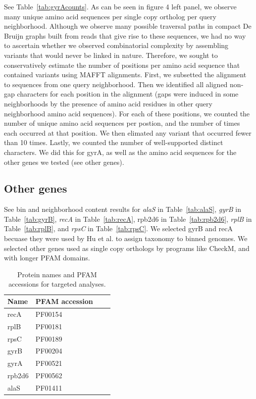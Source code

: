 See Table~\ref{tab:gyrAcounts}. As can be seen in figure 4 left panel, we observe
many unique amino acid sequences per single copy ortholog per query neighborhood.
Although we observe many possible traversal paths in compact De Bruijn graphs built
from reads that give rise to these sequences, we had no way to ascertain whether we
observed combinatorial complexity by assembling variants that would never be linked 
in nature. Therefore, we sought to conservatively estimate the number of positions
per amino acid sequence that contained variants using MAFFT alignments. First, we 
subsetted the alignment to sequences from one query neighborhood. Then we identified
all aligned non-gap characters for each position in the alignment (gaps were induced
in some neighborhoods by the presence of amino acid residues in other query neighborhood
amino acid sequences). For each of these positions, we counted the number of unique 
amino acid sequences per postion, and the number of times each occurred at that position. 
We then elimated any variant that occurred fewer than 10 times. Lastly, we counted the 
number of well-supported distinct characters. We did this for gyrA, as well as the 
amino acid sequences for the other genes we tested (see other genes).  

\subsection{Other genes}

\label{subsec:othergenes}

See bin and neighborhood content results for {\em alaS} in Table~\ref{tab:alaS}, {\em gyrB} in Table~\ref{tab:gyrB}, {\em recA} in Table~\ref{tab:recA}, rpb2d6 in Table~\ref{tab:rpb2d6}, {\em rplB} in Table~\ref{tab:rplB}, and {\em rpsC} in Table~\ref{tab:rpsC}. We selected gyrB and
recA becuase they were used by Hu et al. to assign taxonomy to binned genomes. We selected
other genes used as single copy orthologs by programs like CheckM, and with longer PFAM
domains. 


\begin{table}
  \begin{tabular}{l l c c }
    \toprule
    Name & PFAM accession \\
    \midrule
    recA & PF00154 \\
    rplB & PF00181 \\
    rpsC & PF00189 \\
    gyrB & PF00204 \\
    gyrA & PF00521 \\
    rpb2d6 & PF00562 \\
    alaS & PF01411 \\
    \hline
    \bottomrule
  \end{tabular}
  \caption{Protein names and PFAM accessions for targeted analyses.}
  \label{tab:pfam_accessions}
\end{table}

